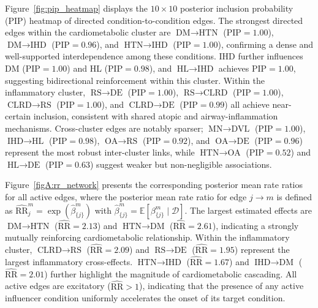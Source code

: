 \documentclass[12pt]{article}
\begin{document}
Figure~\ref{fig:pip_heatmap} displays the $10 \times 10$ posterior inclusion probability (PIP) heatmap of directed condition-to-condition edges. The strongest directed edges within the cardiometabolic cluster are $\text{DM} \to \text{HTN}$ ($\text{PIP} = 1.00$), 
$\text{DM} \to \text{IHD}$ ($\text{PIP} = 0.96$), and $\text{HTN} \to \text{IHD}$ ($\text{PIP} = 1.00$), confirming a dense and well-supported interdependence among these conditions. IHD further influences DM ($\text{PIP} = 1.00$) and HL ($\text{PIP} = 0.98$), 
and $\text{HL} \to \text{IHD}$ achieves $\text{PIP} = 1.00$, suggesting bidirectional reinforcement within this cluster. Within the inflammatory cluster, 
$\text{RS} \to \text{DE}$ ($\text{PIP} = 1.00$), $\text{RS} \to \text{CLRD}$ ($\text{PIP} = 1.00$), $\text{CLRD} \to \text{RS}$ ($\text{PIP} = 1.00$), and 
$\text{CLRD} \to \text{DE}$ ($\text{PIP} = 0.99$) all achieve near-certain inclusion, consistent with shared atopic and airway-inflammation mechanisms. Cross-cluster edges are notably sparser; $\text{MN} \to \text{DVL}$ ($\text{PIP} = 1.00$), $\text{IHD} \to \text{HL}$ ($\text{PIP} = 0.98$), $\text{OA} \to \text{RS}$ ($\text{PIP} = 0.92$), and $\text{OA} \to \text{DE}$ ($\text{PIP} = 0.96$) represent the most robust inter-cluster links, while $\text{HTN} \to \text{OA}$ ($\text{PIP} = 0.52$) and $\text{HL} \to \text{DE}$ ($\text{PIP} = 0.63$) suggest weaker but non-negligible associations.

Figure~\ref{figA:rr_network} presents the corresponding posterior mean rate ratios for all active edges, where the posterior mean rate ratio for edge $j \to m$ is defined as $\widehat{\text{RR}}_j^m = \exp(\hat{\beta}^m_{\{j\}})$ with $\hat{\beta}^m_{\{j\}} = \mathbb{E}[\beta^m_{\{j\}} \mid \mathcal{D}]$. The largest estimated effects are $\text{DM} \to \text{HTN}$ ($\widehat{\text{RR}} = 2.13$) and $\text{HTN} \to \text{DM}$ ($\widehat{\text{RR}} = 2.61$), indicating a strongly mutually reinforcing cardiometabolic relationship. Within the inflammatory cluster, $\text{CLRD} \to \text{RS}$ ($\widehat{\text{RR}} = 2.09$) and $\text{RS} \to \text{DE}$ ($\widehat{\text{RR}} = 1.95$) represent the largest inflammatory cross-effects. 
$\text{HTN} \to \text{IHD}$ ($\widehat{\text{RR}} = 1.67$) and $\text{IHD} \to \text{DM}$ ($\widehat{\text{RR}} = 2.01$) further highlight the magnitude of cardiometabolic cascading. All active edges are excitatory ($\widehat{\text{RR}} > 1$), 
indicating that the presence of any active influencer condition uniformly accelerates the onset of its target condition.
\end{document}
